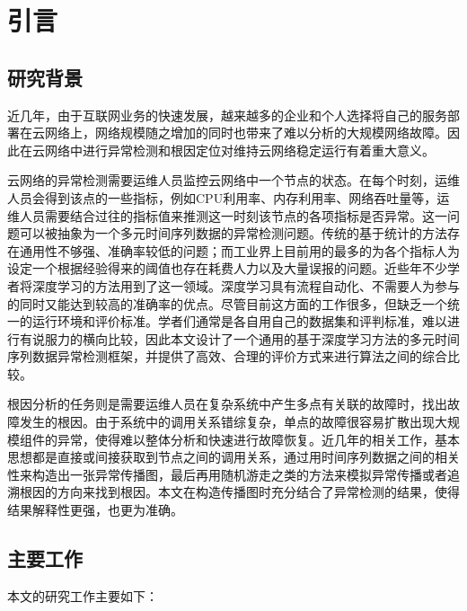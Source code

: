 
\chapter{引言}
\label{cha:intro}

\section{研究背景}
近几年，由于互联网业务的快速发展，越来越多的企业和个人选择将自己的服务部署在云网络上，网络规模随之增加的同时也带来了难以分析的大规模网络故障。因此在云网络中进行异常检测和根因定位对维持云网络稳定运行有着重大意义。

云网络的异常检测需要运维人员监控云网络中一个节点的状态。在每个时刻，运维人员会得到该点的一些指标，例如CPU利用率、内存利用率、网络吞吐量等，运维人员需要结合过往的指标值来推测这一时刻该节点的各项指标是否异常。这一问题可以被抽象为一个多元时间序列数据的异常检测问题。传统的基于统计的方法存在通用性不够强、准确率较低的问题；而工业界上目前用的最多的为各个指标人为设定一个根据经验得来的阈值也存在耗费人力以及大量误报的问题。近些年不少学者\cite{an2015variational,malhotra2015long,malhotra2016lstm,nguyen2018anomaly,park2018multimodal,ruff2018deep,su2019robust,zong2018deep,xu2018unsupervised,siffer2017anomaly}将深度学习的方法用到了这一领域。深度学习具有流程自动化、不需要人为参与的同时又能达到较高的准确率的优点。尽管目前这方面的工作很多，但缺乏一个统一的运行环境和评价标准。学者们通常是各自用自己的数据集和评判标准，难以进行有说服力的横向比较，因此本文设计了一个通用的基于深度学习方法的多元时间序列数据异常检测框架，并提供了高效、合理的评价方式来进行算法之间的综合比较。

根因分析的任务则是需要运维人员在复杂系统中产生多点有关联的故障时，找出故障发生的根因。由于系统中的调用关系错综复杂，单点的故障很容易扩散出现大规模组件的异常，使得难以整体分析和快速进行故障恢复。近几年的相关工作\cite{lin2016automated,weng2018root,wu2020microrca}，基本思想都是直接或间接获取到节点之间的调用关系，通过用时间序列数据之间的相关性来构造出一张异常传播图，最后再用随机游走之类的方法来模拟异常传播或者追溯根因的方向来找到根因。本文在构造传播图时充分结合了异常检测的结果，使得结果解释性更强，也更为准确。


\section{主要工作}
本文的研究工作主要如下：

